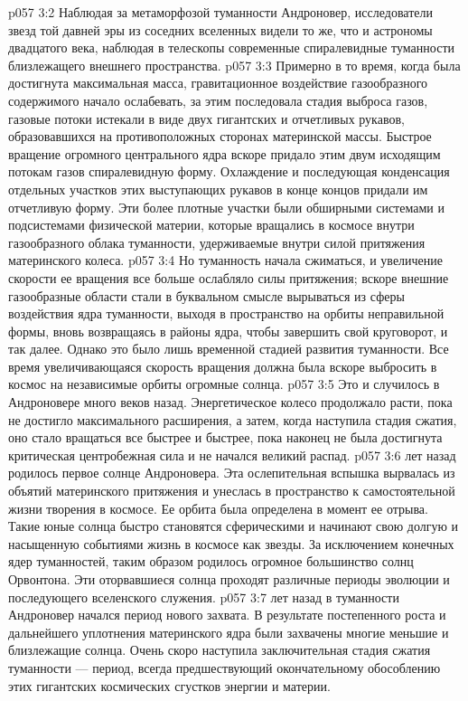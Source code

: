 \vs p057 3:2 Наблюдая за метаморфозой туманности Андроновер, исследователи звезд той давней эры из соседних вселенных видели то же, что и астрономы двадцатого века, наблюдая в телескопы современные спиралевидные туманности близлежащего внешнего пространства.
\vs p057 3:3 Примерно в то время, когда была достигнута максимальная масса, гравитационное воздействие газообразного содержимого начало ослабевать, за этим последовала стадия выброса газов, газовые потоки истекали в виде двух гигантских и отчетливых рукавов, образовавшихся на противоположных сторонах материнской массы. Быстрое вращение огромного центрального ядра вскоре придало этим двум исходящим потокам газов спиралевидную форму. Охлаждение и последующая конденсация отдельных участков этих выступающих рукавов в конце концов придали им отчетливую форму. Эти более плотные участки были обширными системами и подсистемами физической материи, которые вращались в космосе внутри газообразного облака туманности, удерживаемые внутри силой притяжения материнского колеса.
\vs p057 3:4 Но туманность начала сжиматься, и увеличение скорости ее вращения все больше ослабляло силы притяжения; вскоре внешние газообразные области стали в буквальном смысле вырываться из сферы воздействия ядра туманности, выходя в пространство на орбиты неправильной формы, вновь возвращаясь в районы ядра, чтобы завершить свой круговорот, и так далее. Однако это было лишь временной стадией развития туманности. Все время увеличивающаяся скорость вращения должна была вскоре выбросить в космос на независимые орбиты огромные солнца.
\vs p057 3:5 Это и случилось в Андроновере много веков назад. Энергетическое колесо продолжало расти, пока не достигло максимального расширения, а затем, когда наступила стадия сжатия, оно стало вращаться все быстрее и быстрее, пока наконец не была достигнута критическая центробежная сила и не начался великий распад.
\vs p057 3:6 \pc {} лет назад родилось первое солнце Андроновера. Эта ослепительная вспышка вырвалась из объятий материнского притяжения и унеслась в пространство к самостоятельной жизни творения в космосе. Ее орбита была определена в момент ее отрыва. Такие юные солнца быстро становятся сферическими и начинают свою долгую и насыщенную событиями жизнь в космосе как звезды. За исключением конечных ядер туманностей, таким образом родилось огромное большинство солнц Орвонтона. Эти оторвавшиеся солнца проходят различные периоды эволюции и последующего вселенского служения.
\vs p057 3:7 \pc {} лет назад в туманности Андроновер начался период нового захвата. В результате постепенного роста и дальнейшего уплотнения материнского ядра были захвачены многие меньшие и близлежащие солнца. Очень скоро наступила заключительная стадия сжатия туманности --- период, всегда предшествующий окончательному обособлению этих гигантских космических сгустков энергии и материи.
